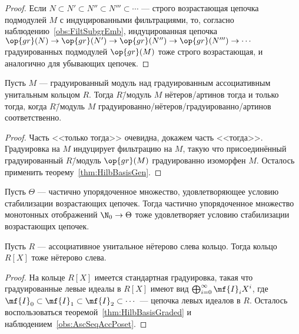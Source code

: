\documentclass[
	extrafontsizes,
	11pt,
	hyphens,
]{memoir}
\begin{document}
\begin{proof}
Если \(N \subset N' \subset N'' \subset N''' \subset \cdots{}\) --- строго возрастающая цепочка подмодулей \(M\) с индуцированными фильтрациями, то, согласно наблюдению~\ref{obs:FiltSubgrEmb}, индуцированная цепочка \(\op{gr}(N) \to \op{gr}(N') \to \op{gr}(N'') \to \op{gr}(N''') \to \cdots{}\) градуированных подмодулей \(\op{gr}(M)\) тоже строго возрастающая, и аналогично для убывающих цепочек.
\end{proof}

\begin{theorem}
Пусть \(M\) --- градуированный модуль над градуированным ассоциативным унитальным кольцом \(R\).%
\label{thm:HilbBasisGraded}
Тогда \(R\)\=/модуль \(M\) нётеров/артинов тогда и только тогда, когда \(R\)\=/модуль \(M\) градуированно\-/нётеров\slash градуированно\-/артинов соответственно.
\end{theorem}

\begin{proof}
Часть <<только тогда>> очевидна, докажем часть <<тогда>>.
Градуировка на \(M\) индуцирует фильтрацию на \(M\), такую что присоединённый градуированный \(R\)\=/модуль \(\op{gr}(M)\) градуированно изоморфен \(M\). Осталось применить теорему~\ref{thm:HilbBasisGen}.
\end{proof}

\begin{observation}
Пусть \(\Theta\) --- частично упорядоченное множество, удовлетворяющее условию стабилизации возрастающих цепочек.%
\label{obs:AscSeqAccPoset}
Тогда частично упорядоченное множество монотонных отображений \(\N_0 \to \Theta\) тоже удовлетворяет условию стабилизации возрастающих цепочек.
\end{observation}

\begin{theorem}
Пусть \(R\) --- ассоциативное унитальное нётерово слева кольцо.
Тогда кольцо \(R[X]\) тоже нётерово слева.
\end{theorem}

\begin{proof}
На кольце \(R[X]\) имеется стандартная градуировка, такая что градуированные левые идеалы в \(R[X]\) имеют вид \(\bigoplus_{i = 0}^{\infty} \mf{I}_i X^i\), где \(\mf{I}_0 \subset \mf{I}_1 \subset \mf{I}_2 \subset \cdots{}\) --- цепочка левых идеалов в \(R\).
Осталось воспользоваться теоремой~\ref{thm:HilbBasisGraded} и наблюдением~\ref{obs:AscSeqAccPoset}.
\end{proof}
\end{document}
